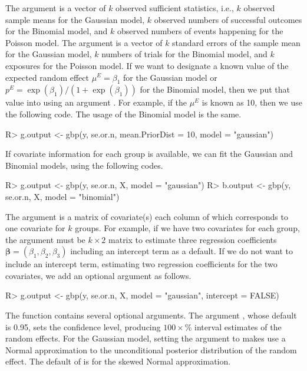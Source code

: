\documentclass[article]{jss}
\begin{document}
The argument  is a vector of $k$ observed sufficient statistics, i.e., $k$ observed sample means for the Gaussian model, $k$ observed numbers of successful outcomes for the Binomial model, and $k$ observed numbers of events happening for the Poisson model. The argument   is a vector of $k$ standard errors of the sample mean for the Gaussian model, $k$ numbers of trials for the Binomial model, and $k$ exposures for the Poisson model. If we want to designate a known value of the expected random effect $\mu^E=\beta_1$ for the Gaussian model or $p^E=\exp(\beta_1)/(1+\exp(\beta_1))$ for the Binomial model, then we put that value into  using an argument . For example, if the $\mu^E$ is known as 10, then we use the following code. The usage of the Binomial model is the same.
\begin{CodeChunk}
\begin{CodeInput}
R> g.output <- gbp(y, se.or.n, mean.PriorDist = 10, model = "gaussian")
\end{CodeInput}
\end{CodeChunk}

If covariate information for each group is available, we can fit the Gaussian and Binomial models, using the following codes.
\begin{CodeChunk}
\begin{CodeInput}
R> g.output <- gbp(y, se.or.n, X, model = "gaussian")
R> b.output <- gbp(y, se.or.n, X, model = "binomial")
\end{CodeInput}
\end{CodeChunk}

The argument  is a matrix of covariate(s) each column of which corresponds to one covariate for $k$ groups. For example, if we have two covariates for each group, the argument  must be $k\times2$ matrix to estimate three regression coefficients $\boldsymbol{\beta}=(\beta_1, \beta_2, \beta_3)$ including an intercept term as a default. If we do not want to include an intercept term, estimating two regression coefficients for the two covariates, we add an optional argument  as follows.
\begin{CodeChunk}
\begin{CodeInput}
R> g.output <- gbp(y, se.or.n, X, model = "gaussian", intercept = FALSE)
\end{CodeInput}
\end{CodeChunk}

The function  contains several optional arguments. The argument , whose default is 0.95, sets the confidence level, producing $100\times$\% interval estimates of the random effects. For the Gaussian model, setting the argument  to  makes  use a Normal approximation to the unconditional posterior distribution of the random effect. The default of  is  for the skewed Normal approximation. 
\end{document}
